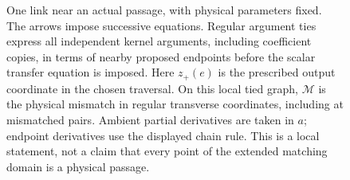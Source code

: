 \begin{figure}[htbp]
\centering
{}
\caption{One link near an actual passage, with physical parameters fixed.
The arrows impose successive equations.  Regular argument ties express
all independent kernel arguments, including coefficient copies, in terms
of nearby proposed endpoints before the scalar transfer equation is
imposed.  Here $z_+(e)$ is the prescribed output coordinate in the chosen
traversal.  On this local tied graph, $\mathcal M$ is the physical mismatch
in regular transverse coordinates, including at mismatched pairs.
Ambient partial derivatives are taken in $a$; endpoint derivatives use
the displayed chain rule.  This is a local statement, not a claim that
every point of the extended matching domain is a physical passage.}
\label{fig:matching-arguments}
\end{figure}
